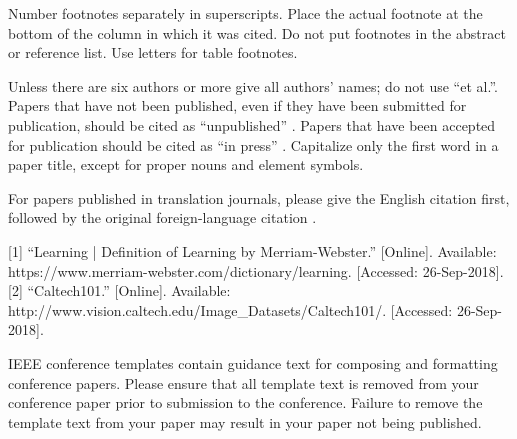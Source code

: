 \documentclass[conference]{IEEEtran}
\begin{document}
Number footnotes separately in superscripts. Place the actual footnote at 
the bottom of the column in which it was cited. Do not put footnotes in the 
abstract or reference list. Use letters for table footnotes.

Unless there are six authors or more give all authors' names; do not use 
``et al.''. Papers that have not been published, even if they have been 
submitted for publication, should be cited as ``unpublished'' \cite{b4}. Papers 
that have been accepted for publication should be cited as ``in press'' \cite{b5}. 
Capitalize only the first word in a paper title, except for proper nouns and 
element symbols.

For papers published in translation journals, please give the English 
citation first, followed by the original foreign-language citation \cite{b6}.

\begin{thebibliography}{00}
 [1] “Learning | Definition of Learning by Merriam-Webster.” [Online]. Available: https://www.merriam-webster.com/dictionary/learning. [Accessed: 26-Sep-2018].
 [2] “Caltech101.” [Online]. Available: http://www.vision.caltech.edu/Image\_Datasets/Caltech101/. [Accessed: 26-Sep-2018].
\end{thebibliography}
\vspace{12pt}
\color{red}
IEEE conference templates contain guidance text for composing and formatting conference papers. Please ensure that all template text is removed from your conference paper prior to submission to the conference. Failure to remove the template text from your paper may result in your paper not being published.
\end{document}
